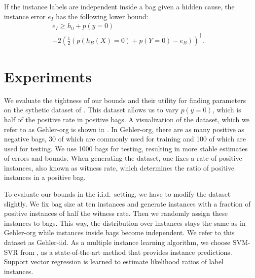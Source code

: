 \begin{theorem}\label{lowerbound}
If the instance labels are independent inside a bag given a hidden cause, the instance
error $e_I$ has the following lower bound:
\begin{multline*}
e_I \geq h_0 + p(y=0)\\ 
- 2 \left (\frac{1}{2} (p(h_B(X)=0) + p(Y=0) - e_B) \right)^\frac{1}{r}.
\end{multline*}
\end{theorem}


\section{Experiments}
We evaluate the tightness of our bounds and their utility for finding parameters on the sythetic dataset of \citet{gehler2007deterministic}.
This dataset allows us to vary $p(y=0)$, which is half of the positive rate in positive bags.
A visualization of the dataset, which we refer to as Gehler-org is shown in . In Gehler-org, there are as many positive
as negative bags, 30 of which are commonly used for training and 100 of which are used for testing.
We use 1000 bags for testing, resulting in more stable estimates of errors and bounds.
When generating the dataset, one fixes a rate of positive instances, also known as witness rate, which determines the ratio
of positive instances in a positive bag.

To evaluate our bounds in the i.i.d.\ setting, we have to modify the dataset slightly. We fix bag size at ten instances and generate instances
with a fraction of positive instances of half the witness rate. Then we randomly assign these instances to bags.
This way, the distribution over instances stays the same as in Gehler-org while instances inside bags become independent.
We refer to this dataset as Gehler-iid.
As a multiple instance learning algorithm, we choose SVM-SVR from \citet{liconvex2010}, as a state-of-the-art method that
provides instance predictions. Support vector regression is learned to estimate likelihood ratios of label instances.

